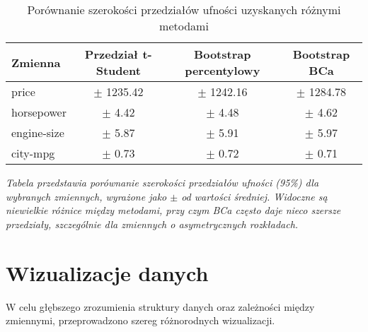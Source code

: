 \documentclass[12pt,a4paper]{article}
\begin{document}
\begin{table}[H]
    \centering
    \caption{Porównanie szerokości przedziałów ufności uzyskanych różnymi metodami}
    \label{tab:ci_width_comparison}
    \begin{tabular}{lccc}
        \toprule
        \textbf{Zmienna} & \textbf{Przedział t-Student} & \textbf{Bootstrap percentylowy} & \textbf{Bootstrap BCa} \\
        \midrule
        price & $\pm$ 1235.42 & $\pm$ 1242.16 & $\pm$ 1284.78 \\
        horsepower & $\pm$ 4.42 & $\pm$ 4.48 & $\pm$ 4.62 \\
        engine-size & $\pm$ 5.87 & $\pm$ 5.91 & $\pm$ 5.97 \\
        city-mpg & $\pm$ 0.73 & $\pm$ 0.72 & $\pm$ 0.71 \\
        \bottomrule
    \end{tabular}
    \small\textit{Tabela przedstawia porównanie szerokości przedziałów ufności (95\%) dla wybranych zmiennych, wyrażone jako $\pm$ od wartości średniej. Widoczne są niewielkie różnice między metodami, przy czym BCa często daje nieco szersze przedziały, szczególnie dla zmiennych o asymetrycznych rozkładach.}
\end{table}

\section{Wizualizacje danych}

W celu głębszego zrozumienia struktury danych oraz zależności między zmiennymi, przeprowadzono szereg różnorodnych wizualizacji.
\end{document}

